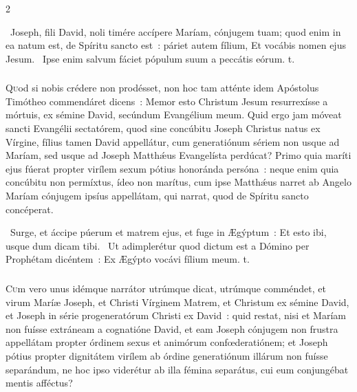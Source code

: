 \documentclass[9pt,twoside]{extarticle}
\begin{document}
\begin{multicols}{2}
{\begin{tightlist}{}
\item {}~Joseph, fili David, noli timére accípere Maríam, cónjugem tuam; quod enim in ea natum est, de Spíritu sancto est~: páriet autem fílium, \textred{*} Et vocábis nomen ejus Jesum. ~Ipse enim salvum fáciet pópulum suum a peccátis eórum. t.
\end{tightlist}

\subsubsection*{\center {}}
\lettrine{Q}uod si nobis crédere non prodésset, non hoc tam atténte idem Apóstolus Timótheo commendáret dicens~: Memor esto Christum Jesum resurrexísse a mórtuis, ex sémine David, secúndum Evangélium meum. Quid ergo jam móveat sancti Evangélii sectatórem, quod sine concúbitu Joseph Christus natus ex Vírgine, fílius tamen David appellátur, cum generatiónum sériem non usque ad Maríam, sed usque ad Joseph Matthǽus Evangelísta perdúcat? Primo quia maríti ejus fúerat propter virílem sexum pótius honoránda persóna~: neque enim quia concúbitu non permíxtus, ídeo non marítus, cum ipse Matthǽus narret ab Angelo Maríam cónjugem ipsíus appellátam, qui narrat, quod de Spíritu sancto concéperat.

\begin{tightlist}{}
\item {}~Surge, et áccipe púerum et matrem ejus, et fuge in Ægýptum~: \textred{*} Et esto ibi, usque dum dicam tibi. ~Ut adimplerétur quod dictum est a Dómino per Prophétam dicéntem~: Ex Ægýpto vocávi fílium meum. t.
\end{tightlist}

\subsubsection*{\center {}}
\lettrine{C}um vero unus idémque narrátor utrúmque dicat, utrúmque comméndet, et virum Maríæ Joseph, et Christi Vírginem Matrem, et Christum ex sémine David, et Joseph in série progeneratórum Christi ex David~: quid restat, nisi et Maríam non fuísse extráneam a cognatióne David, et eam Joseph cónjugem non frustra appellátam propter órdinem sexus et animórum confœderatiónem; et Joseph pótius propter dignitátem virílem ab órdine generatiónum illárum non fuísse separándum, ne hoc ipso viderétur ab illa fémina separátus, cui eum conjungébat mentis afféctus?

}
\end{multicols}
\end{document}

